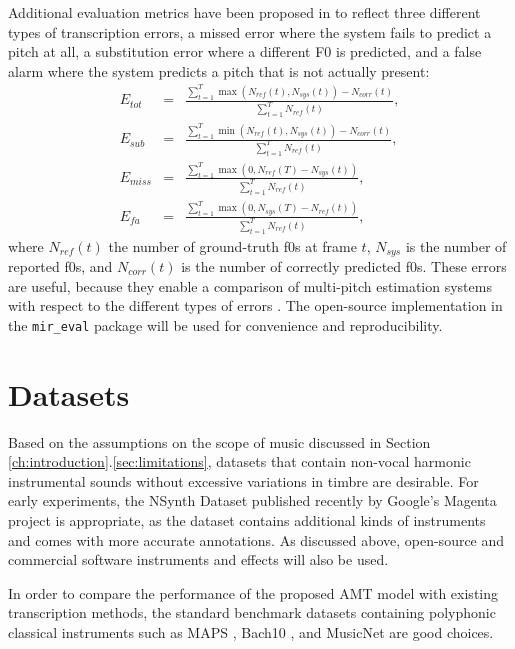 Additional evaluation metrics have been proposed in \cite{poliner2007piano} to reflect three different types of transcription errors, a missed error where the system fails to predict a pitch at all, a substitution error where a different F0 is predicted, and a false alarm where the system predicts a pitch that is not actually present:
\begin{eqnarray}
E_{tot} & = & \frac{\sum_{t=1}^T \max ( N_{ref}(t), N_{sys}(t) ) - N_{corr}(t)}{\sum_{t=1}^T N_{ref}(t)}, \\
E_{sub} & = & \frac{\sum_{t=1}^T \min ( N_{ref}(t), N_{sys}(t) ) - N_{corr}(t)}{\sum_{t=1}^T N_{ref}(t)}, \\
E_{miss} & = & \frac{\sum_{t=1}^T \max ( 0, N_{ref}(T) - N_{sys}(t) )}{\sum_{t=1}^T N_{ref}(t)}, \\
E_{fa} & = &  \frac{\sum_{t=1}^T \max ( 0, N_{sys}(T) - N_{ref}(t) )}{\sum_{t=1}^T N_{ref}(t)},
\end{eqnarray}
where $N_{ref}(t)$ the number of ground-truth f0s at frame $t$, $N_{sys}$ is the number of reported f0s, and $N_{corr}(t)$ is the number of correctly predicted f0s.
These errors are useful, because they enable a comparison of multi-pitch estimation systems with respect to the different types of errors \cite{bay2009evaluation}.
The open-source implementation in the \texttt{mir\_eval} package \cite{raffel2014mir_eval} will be used for convenience and reproducibility.

\section{Datasets}

Based on the assumptions on the scope of music discussed in Section \ref{ch:introduction}.\ref{sec:limitations}, datasets that contain non-vocal harmonic instrumental sounds without excessive variations in timbre are desirable.
For early experiments, the NSynth Dataset published recently by Google's Magenta project \cite{engel2017nsynth} is appropriate, as the dataset contains additional kinds of instruments and comes with more accurate annotations.
As discussed above, open-source and commercial software instruments and effects will also be used.

In order to compare the performance of the proposed AMT model with existing transcription methods, the standard benchmark datasets containing polyphonic classical instruments such as MAPS \cite{emiya2010multipitch}, Bach10 \cite{duan2010bach10}, and MusicNet \cite{thickstun2017musicnet} are good choices.
